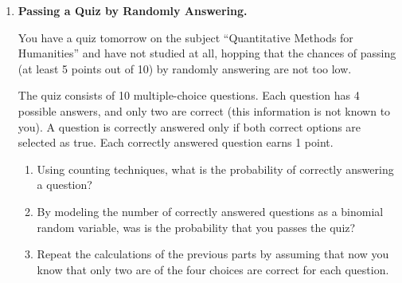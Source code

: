 \documentclass[12pt]{article}
\begin{document}
\begin{enumerate}
    We use now Bayes' theorem to determine the probability that a given machine is responsible for an error, given that a message was not properly decoded. That is,
    \begin{align}\label{eq:Bayes_machine}
        P(M_i\ |\ F) = \frac{P(F\ |\ M_i)P(M_i)}{P(F)}.
    \end{align}
    We already have the value of the numerator, and to compute the one on the denominator, $P(F)$, we use the law of the total probability:
    \begin{align*}
        P(F) &= \sum_{i=1}^5 P(F\ |\ M_i)P(M_i) \\
        &= 0.10 \times \frac{300}{1500} + 0.05 \times \frac{400}{1500} + 0.15 \times \frac{250}{1500} 
        + 0.17 \times \frac{340}{1500} + 0.20 \times \frac{210}{1500} 
        = 0.1249.
    \end{align*}
    Going back to Bayes' formula \eqref{eq:Bayes_machine},
    \begin{align*}
        P(M_1 | F) &= \frac{0.02}{0.1249} \approx 0.16 \\
        P(M_2 | F) &= \frac{0.0133}{0.1249} \approx 0.107 \\
        P(M_3 | F) &= \frac{0.025}{0.1249} \approx 0.2 \\
        P(M_4 | F) &= \frac{0.0386}{0.1249} \approx 0.31 \\
        P(M_5 | F) &= \frac{0.028}{0.1249} \approx 0.22
    \end{align*}
    
    \fi \color{black}
    
    \item \textbf{Passing a Quiz by Randomly Answering.}
    
    You have a quiz tomorrow on the subject ``Quantitative Methods for Humanities'' and have not studied at all, hopping that the chances of passing (at least 5 points out of 10) by randomly answering are not too low. 
    
    The quiz consists of 10 multiple-choice questions. Each question has 4 possible answers, and only two are correct (this information is not known to you). A question is correctly answered only if both correct options are selected as true. Each correctly answered question earns 1 point.

    \begin{enumerate}[label=\alph*)]
        \item Using counting techniques, what is the probability of correctly answering a question?
        \item By modeling the number of correctly answered questions as a binomial random variable, was is the probability that you passes the quiz?
        \item Repeat the calculations of the previous parts by assuming that now you know that only two are of the four choices are correct for each question.
    \end{enumerate}


\end{enumerate}
\end{document}
